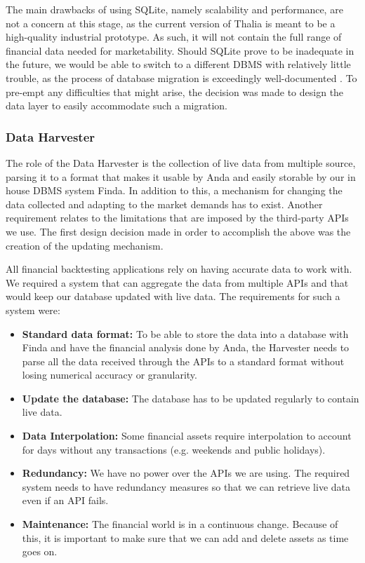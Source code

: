 \documentclass[main.tex]{subfiles}
\begin{document}
The main drawbacks of using SQLite, namely scalability and performance, are not a concern at this stage, as the current version of Thalia is meant to be a high-quality industrial prototype. As such, it will not contain the full range of financial data needed for marketability. Should SQLite prove to be inadequate in the future, we would be able to switch to a different DBMS with relatively little trouble, as the process of database migration is exceedingly well-documented \cite{frameworkDataMigration} \cite{understandingDataMigration}. To pre-empt any difficulties that might arise, the decision was made to design the data layer to easily accommodate such a migration.

\subsubsection{Data Harvester}
\label{Data Harvester}

The role of the Data Harvester is the collection of live data from multiple source, parsing it to a format that makes it usable by Anda and easily storable by our in house DBMS system Finda. In addition to this, a mechanism for changing the data collected and adapting to the market demands has to exist. Another requirement relates to the limitations that are imposed by the third-party APIs we use. The first design decision made in order to accomplish the above was the creation of the updating mechanism.

All financial backtesting applications rely on having accurate data to work with. We required a system that can aggregate the data from multiple APIs and that would keep our database updated with live data.
The requirements for such a system were:

\begin{itemize}
    \item \textbf{Standard data format:} To be able to store the data into a database with Finda and have the financial analysis done by Anda, the Harvester needs to parse all the data received through the APIs to a standard format without losing numerical accuracy or granularity.
    \item \textbf{Update the database:} The database has to be updated regularly to contain live data.
    \item \textbf{Data Interpolation:} Some financial assets require interpolation to account for days without any transactions (e.g. weekends and public holidays).
    \item \textbf{Redundancy:} We have no power over the APIs we are using. The required system needs to have redundancy measures so that we can retrieve live data even if an API fails.
    \item \textbf{Maintenance:} The financial world is in a continuous change. Because of this, it is important to make sure that we can add and delete assets as time goes on.
\end{itemize}
\end{document}
